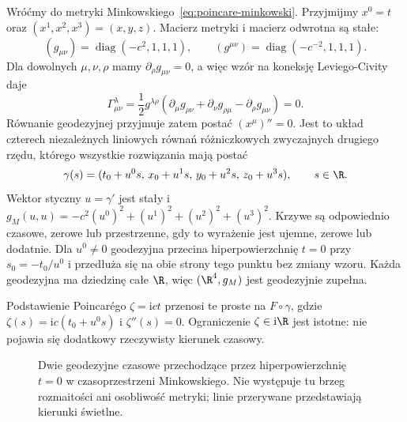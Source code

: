 \begin{przyklad}
\label{prz:poincare-geodezyjne}
Wróćmy do metryki Minkowskiego~\eqref{eq:poincare-minkowski}.
Przyjmijmy $x^0=t$ oraz $(x^1,x^2,x^3)=(x,y,z)$.
Macierz metryki i macierz odwrotna są stałe:
\[
 (g_{\mu\nu})=\operatorname{diag}(-c^2,1,1,1),\qquad
 (g^{\mu\nu})=\operatorname{diag}(-c^{-2},1,1,1).
\]
Dla dowolnych $\mu,\nu,\rho$ mamy
$\partial_\rho g_{\mu\nu}=0$, a więc wzór
na koneksję Leviego-Civity daje
\begin{equation}\label{eq:poincare-christoffel}
 \Gamma^\lambda_{\mu\nu}
 =\frac12g^{\lambda\rho}
 (\partial_\mu g_{\rho\nu}+\partial_\nu g_{\rho\mu}
 -\partial_\rho g_{\mu\nu})=0.
\end{equation}
Równanie geodezyjnej przyjmuje zatem postać
$(x^\mu)''=0$. Jest to układ czterech niezależnych
liniowych równań różniczkowych zwyczajnych drugiego
rzędu, którego wszystkie rozwiązania mają postać
\begin{equation}\label{eq:poincare-geodezyjne}
 \gamma(s)=(t_0+u^0s,\,x_0+u^1s,\,
 y_0+u^2s,\,z_0+u^3s),\qquad s\in\R.
\end{equation}
Wektor styczny $u=\gamma'$ jest stały i
$g_M(u,u)=-c^2(u^0)^2+(u^1)^2+(u^2)^2+(u^3)^2$.
Krzywe są odpowiednio czasowe, zerowe lub przestrzenne,
gdy to wyrażenie jest ujemne, zerowe lub dodatnie.
Dla $u^0\neq0$ geodezyjna przecina hiperpowierzchnię
$t=0$ przy $s_0=-t_0/u^0$ i przedłuża się na obie
strony tego punktu bez zmiany wzoru.
Każda geodezyjna ma dziedzinę całe $\R$,
więc $(\R^4,g_M)$ jest geodezyjnie zupełna.

Podstawienie Poincarégo $\zeta=\mathrm{i}ct$ przenosi
te proste na $F\circ\gamma$, gdzie
$\zeta(s)=\mathrm{i}c(t_0+u^0s)$ i $\zeta''(s)=0$.
Ograniczenie $\zeta\in\mathrm{i}\R$ jest istotne:
nie pojawia się dodatkowy rzeczywisty kierunek czasowy.

\begin{figure}[htbp]
\centering
{}
\caption{Dwie geodezyjne czasowe przechodzące przez
hiperpowierzchnię $t=0$ w czasoprzestrzeni Minkowskiego.
Nie występuje tu brzeg rozmaitości ani osobliwość
metryki; linie przerywane przedstawiają kierunki świetlne.}
\label{fig:poincare-geodezyjne-zero}
\end{figure}
\end{przyklad}


